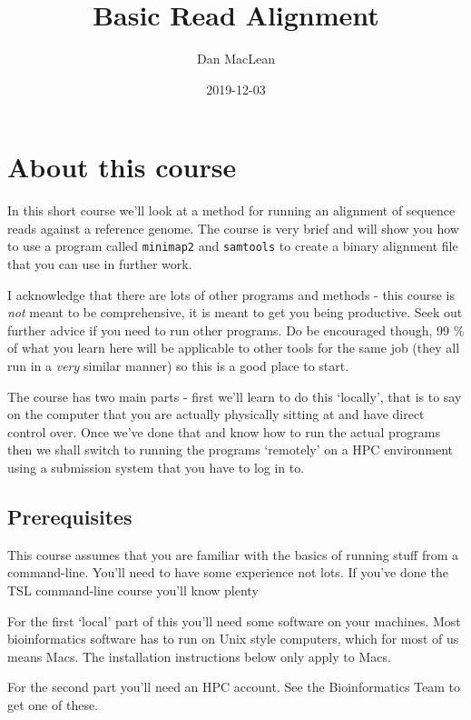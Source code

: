 \documentclass[]{book}
\title{Basic Read Alignment}
\author{Dan MacLean}
\date{2019-12-03}
\begin{document}
\maketitle

{
\setcounter{tocdepth}{1}
\tableofcontents
}
\hypertarget{about-this-course}{%
\chapter{About this course}\label{about-this-course}}

In this short course we'll look at a method for running an alignment of sequence reads against a reference genome. The course is very brief and will show you how to use a program called \texttt{minimap2} and \texttt{samtools} to create a binary alignment file that you can use in further work.

I acknowledge that there are lots of other programs and methods - this course is \emph{not} meant to be comprehensive, it is meant to get you being productive. Seek out further advice if you need to run other programs. Do be encouraged though, 99 \% of what you learn here will be applicable to other tools for the same job (they all run in a \emph{very} similar manner) so this is a good place to start.

The course has two main parts - first we'll learn to do this `locally', that is to say on the computer that you are actually physically sitting at and have direct control over. Once we've done that and know how to run the actual programs then we shall switch to running the programs `remotely' on a HPC environment using a submission system that you have to log in to.

\hypertarget{prerequisites}{%
\section{Prerequisites}\label{prerequisites}}

This course assumes that you are familiar with the basics of running stuff from a command-line. You'll need to have some experience not lots. If you've done the TSL command-line course you'll know plenty

For the first `local' part of this you'll need some software on your machines. Most bioinformatics software has to run on Unix style computers, which for most of us means Macs. The installation instructions below only apply to Macs.

For the second part you'll need an HPC account. See the Bioinformatics Team to get one of these.
\end{document}
